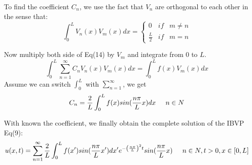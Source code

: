 \documentclass[12pt]{article} %
\begin{document}
To find the coefficient $C_{n}$, we use the fact that $V_{n}$ are orthogonal to each other in the sense that:
\begin{equation}
\int_{0}^{L}V_{n}(x)V_{m}(x)dx = 
\left\{
\begin{array}{lcc}
0 & if & m \neq n \\
\frac{L}{2} & if& m = n
\end{array}
\right.
\end{equation}\par
Now multiply both side of Eq(14) by $V_{m}$ and integrate from 0 to $L$.
$$
\int_{0}^{L}\sum_{n=1}^{\infty}C_{n}V_{n}(x)V_{m}(x)dx = \int_{0}^{L}f(x)V_{m}(x)dx
$$
Assume we can switch $\int_{0}^{L}$ with $\sum_{n=1}^{\infty}$, we get
$$
C_{n} = \frac{2}{L}\int_{0}^{L}f(x)sin(\frac{n\pi}{L}x)dx \hspace{5mm} n\in N
$$\par
With known the coefficient, we finally obtain the complete solution of the IBVP Eq(9):
\begin{equation}
u(x, t) = \sum_{n=1}^{\infty}\frac{2}{L}\int_{0}^{L}f(x')sin(\frac{n\pi}{L}x')dx' e^{ - \left(
\frac{n \pi}{L}
\right)^{2}t}sin(\frac{n\pi}{L}x) \hspace{5mm} n \in N, t>0, x \in [0, L]
\end{equation}
\end{document}
